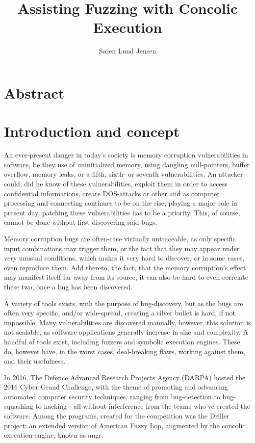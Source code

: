 \documentclass[a4paper]{article}
\title{Assisting Fuzzing with Concolic Execution}
\author{Søren Lund Jensen}
\begin{document}
\maketitle %

\tableofcontents

\newpage
\section{Abstract}

\newpage
\section{Introduction and concept}
An ever-present danger in today's society is memory corruption vulnerabilities in software, be they use of uninitialized memory, using dangling null-pointers, buffer overflow, memory leaks, or a fifth, sixth- or seventh vulnerabilities. An attacker could, did he know of these vulnerabilities, exploit them in order to access confidential informations, create DOS-attacks or other and as computer processing and connecting continues to be on the rise, playing a major role in present day, patching these vulnerabilities has to be a priority. This, of course, cannot be done without first discovering said bugs. 

Memory corruption bugs are often-case virtually untraceable, as only specific input combinations may trigger them, or the fact that they may appear under very unusual conditions, which makes it very hard to discover, or in some cases, even reproduce them. Add thereto, the fact, that the memory corruption's effect may manifest itself far away from its source, it can also be hard to even correlate these two, once a bug has been discovered.

A variety of tools exists, with the purpose of bug-discovery, but as the bugs are often very specific, and/or wide-spread, creating a silver bullet is hard, if not impossible. Many vulnerabilities are discovered manually, however, this solution is not scalable, as software applications generally increase in size and complexity. A handful of tools exist, including fuzzers and symbolic execution engines. These do, however have, in the worst cases, deal-breaking flaws, working against them, and their usefulness.

In 2016, The Defence Advanced Research Projects Agency (DARPA) hosted the 2016 Cyber Grand Challenge, with the theme of promoting and advancing automated computer security techniques, ranging from bug-detection to bug-squashing to hacking - all without interference from the teams who've created the software. Among the programs, created for the competition was the Driller project: an extended version of American Fuzzy Lop, augmented by the concolic execution-engine, known as angr.
\end{document}

